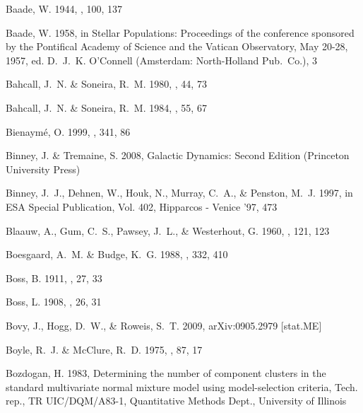 \begin{thebibliography}{99}
{Baade}, W. 1944, \apj, 100, 137

{Baade}, W. 1958, in {Stellar Populations: Proceedings of the conference
  sponsored by the Pontifical Academy of Science and the Vatican Observatory,
  May 20-28, 1957}, ed. D.~J.~K. {O'Connell} ({Amsterdam}: {North-Holland
  Pub.~Co.}), 3

{Bahcall}, J.~N. \& {Soneira}, R.~M. 1980, \apjs, 44, 73

{Bahcall}, J.~N. \& {Soneira}, R.~M. 1984, \apjs, 55, 67

{Bienaym{\'e}}, O. 1999, \aap, 341, 86

{Binney}, J. \& {Tremaine}, S. 2008, {Galactic Dynamics: Second Edition}
  (Princeton University Press)

{Binney}, J.~J., {Dehnen}, W., {Houk}, N., {Murray}, C.~A., \& {Penston}, M.~J.
  1997, in ESA Special Publication, Vol. 402, Hipparcos - Venice '97, 473

{Blaauw}, A., {Gum}, C.~S., {Pawsey}, J.~L., \& {Westerhout}, G. 1960, \mnras,
  121, 123

{Boesgaard}, A.~M. \& {Budge}, K.~G. 1988, \apj, 332, 410

{Boss}, B. 1911, \aj, 27, 33

{Boss}, L. 1908, \aj, 26, 31

{Bovy}, J., {Hogg}, D.~W., \& {Roweis}, S.~T. 2009, {arXiv:0905.2979 [stat.ME]}

{Boyle}, R.~J. \& {McClure}, R.~D. 1975, \pasp, 87, 17

{Bozdogan}, H. 1983, {Determining the number of component clusters in the
  standard multivariate normal mixture model using model-selection criteria},
  Tech. rep., {TR UIC/DQM/A83-1, Quantitative Methods Dept., University of
  Illinois}


\end{thebibliography}
